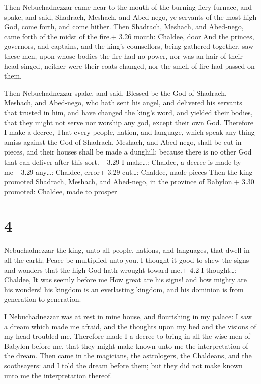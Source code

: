  Then Nebuchadnezzar came near to the mouth of the
burning fiery furnace, and spake, and said, Shadrach, Meshach, and
Abed-nego, ye servants of the most high God, come forth, and come
hither. Then Shadrach, Meshach, and Abed-nego, came forth of the midst
of the fire.+ 3.26 mouth: Chaldee, door  And the princes,
governors, and captains, and the king's counsellors, being gathered
together, saw these men, upon whose bodies the fire had no power, nor
was an hair of their head singed, neither were their coats changed, nor
the smell of fire had passed on them.

 Then Nebuchadnezzar spake, and said, Blessed be the God of
Shadrach, Meshach, and Abed-nego, who hath sent his angel, and delivered
his servants that trusted in him, and have changed the king's word, and
yielded their bodies, that they might not serve nor worship any god,
except their own God.  Therefore I make a decree, That
every people, nation, and language, which speak any thing amiss against
the God of Shadrach, Meshach, and Abed-nego, shall be cut in pieces, and
their houses shall be made a dunghill: because there is no other God
that can deliver after this sort.+ 3.29 I make\ldots: Chaldee, a decree
is made by me+ 3.29 any\ldots: Chaldee, error+ 3.29 cut\ldots: Chaldee,
made pieces  Then the king promoted Shadrach, Meshach, and
Abed-nego, in the province of Babylon.+ 3.30 promoted: Chaldee, made to
prosper

\hypertarget{section-3}{%
\section{4}\label{section-3}}

 Nebuchadnezzar the king, unto all people, nations, and
languages, that dwell in all the earth; Peace be multiplied unto you.
 I thought it good to shew the signs and wonders that the
high God hath wrought toward me.+ 4.2 I thought\ldots: Chaldee, It was
seemly before me  How great are his signs! and how mighty
are his wonders! his kingdom is an everlasting kingdom, and his dominion
is from generation to generation.

 I Nebuchadnezzar was at rest in mine house, and
flourishing in my palace:  I saw a dream which made me
afraid, and the thoughts upon my bed and the visions of my head troubled
me.  Therefore made I a decree to bring in all the wise men
of Babylon before me, that they might make known unto me the
interpretation of the dream.  Then came in the magicians,
the astrologers, the Chaldeans, and the soothsayers: and I told the
dream before them; but they did not make known unto me the
interpretation thereof.

